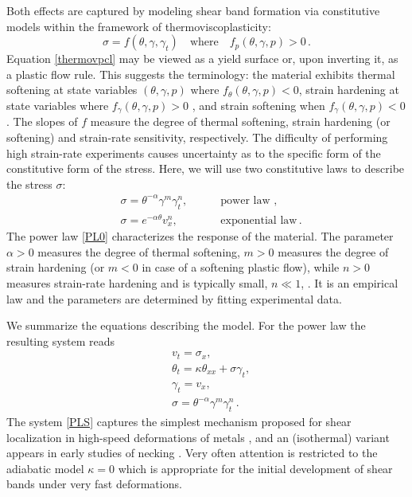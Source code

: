 \documentclass[usletter,11pt]{article}
\newcommand{\ga}{\alpha}
\newcommand{\tht}{\theta}
\theoremstyle{remark}
\begin{document}
Both effects are captured by modeling shear band formation via constitutive models
within the framework  of thermoviscoplasticity: 
\begin{equation}
\label{thermovpcl}
\sigma = f(\theta, \gamma, \gamma_t) \quad \mbox{where} \quad f_p (\theta, \gamma, p)  > 0 \, .
\end{equation}
Equation \eqref{thermovpcl} may be viewed as a yield surface or,  upon inverting it, as a plastic flow rule. This suggests the terminology: 
the material exhibits thermal softening at state variables $(\theta, \gamma, p)$ 
where $f_\theta(\theta, \gamma, p) < 0$, strain hardening at state variables where $f_\gamma(\theta, \gamma, p) > 0$ , and strain softening when $f_\gamma(\theta, \gamma, p) < 0$. 
The slopes of $f$ measure the degree of thermal softening, strain hardening (or softening) 
and strain-rate sensitivity, respectively. 
The difficulty of performing high strain-rate experiments causes uncertainty as to the specific form of the constitutive form of the stress.  Here, we will
use two constitutive laws to describe the stress $\sigma$:
\begin{align}
&  \sigma =  \theta^{-\alpha} \gamma^{m} \gamma_{t}^{n}, \quad & &  \text{ power law }, \label{PL0}\\
& \sigma = e^{-\ga\tht} v_x^n, \quad & & \text{ exponential law} \label{ARL0}  \, .
\end{align}
The power law \eqref{PL0}  characterizes the response of the material. The parameter $\alpha>0$ 
measures the degree of thermal softening, $m>0$ measures the degree of strain hardening (or $m<0$ in case of a softening plastic flow), while $n>0$ measures strain-rate hardening and is typically small, $n \ll 1$, \cite{CDHS, clifton_rev_1990}. It is an empirical law and the parameters are determined by fitting experimental data.



 


We summarize the equations describing the model. For the power law
the resulting system reads
\begin{equation}
  \label{PLS}
  \begin{aligned}
    & v_{t} =  \sigma_{x},\\
    & \theta_{t} = \kappa \theta_{ x x}  +  \sigma \gamma_{t}, \\
    & \gamma_{t} = v_{x},  \\
    & \sigma  = \theta^{-\alpha}\gamma^{m}\gamma_{t}^n \, .
  \end{aligned}
\end{equation}
The system \eqref{PLS} captures the simplest mechanism proposed for shear localization in
high-speed deformations of metals \cite{ZH, clifton_rev_1990}, and an (isothermal) variant appears in early studies of necking \cite{HN77}. 
Very often attention is restricted to the adiabatic model $\kappa = 0$ which is appropriate for the initial
development of shear bands under very fast deformations. 
\end{document}
